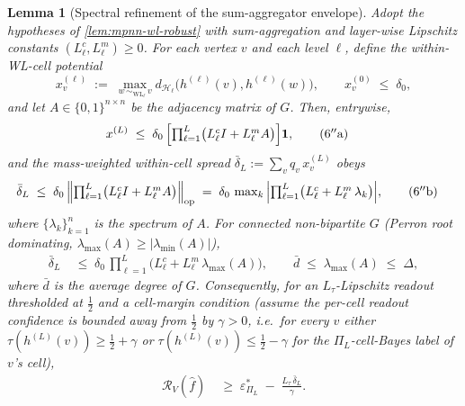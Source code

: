 \documentclass[10pt]{article}
\newtheorem{lemma}[theorem]{Lemma}
\theoremstyle{definition}
\theoremstyle{remark}
\newcommand{\eps}{\varepsilon}
\begin{document}
\begin{lemma}[Spectral refinement of the sum-aggregator envelope]\label{lem:mpnn-wl-spectral}
Adopt the hypotheses of \cref{lem:mpnn-wl-robust} with
sum-aggregation and layer-wise Lipschitz constants
$(L^{c}_{\ell}, L^{m}_{\ell}) \ge 0$. For each vertex $v$ and
each level $\ell$, define the within-WL-cell potential
\[
  x^{(\ell)}_{v} \;:=\;
    \max_{w \,\sim_{\mathrm{WL}_{\ell}}\, v}
      d_{\mathcal{H}_{\ell}}\bigl(h^{(\ell)}(v), h^{(\ell)}(w)\bigr),
  \qquad
  x^{(0)}_{v} \;\le\; \delta_{0},
\]
and let $A \in \{0,1\}^{n \times n}$ be the adjacency matrix
of $G$. Then, entrywise,
\begin{align}
  x^{(L)} \;&\le\; \delta_{0}\,
    \Bigl[ \textstyle\prod_{\ell=1}^{L}
      \bigl(L^{c}_{\ell} I + L^{m}_{\ell} A\bigr) \Bigr] \mathbf{1},
  \tag{6$''$a} \label{eq:six-pp-a}
\end{align}
and the mass-weighted within-cell spread
$\bar{\delta}_{L} := \sum_{v} q_{v}\, x^{(L)}_{v}$ obeys
\begin{align}
  \bar{\delta}_{L} \;&\le\; \delta_{0}\,
    \Bigl\| \textstyle\prod_{\ell=1}^{L}
      \bigl(L^{c}_{\ell} I + L^{m}_{\ell} A\bigr) \Bigr\|_{\mathrm{op}}
    \;=\; \delta_{0}\,
    \max_{k}\, \Bigl|
      \textstyle\prod_{\ell=1}^{L}
        \bigl(L^{c}_{\ell} + L^{m}_{\ell}\, \lambda_{k}\bigr)
    \Bigr|,
  \tag{6$''$b} \label{eq:six-pp-b}
\end{align}
where $\{\lambda_{k}\}_{k=1}^{n}$ is the spectrum of $A$. For
connected non-bipartite $G$ (Perron root dominating,
$\lambda_{\max}(A) \ge |\lambda_{\min}(A)|$),
\begin{align}
  \bar{\delta}_{L} \;&\le\; \delta_{0}\,
    \prod_{\ell=1}^{L}
      \bigl(L^{c}_{\ell} + L^{m}_{\ell}\, \lambda_{\max}(A)\bigr),
  \qquad
  \bar{d} \;\le\; \lambda_{\max}(A) \;\le\; \Delta,
  \tag{6$''$c} \label{eq:six-pp-c}
\end{align}
where $\bar{d}$ is the average degree of $G$. Consequently,
for an $L_{\tau}$-Lipschitz readout thresholded at
$\tfrac{1}{2}$ \emph{and a cell-margin condition} (assume the
per-cell readout confidence is bounded away from $\tfrac{1}{2}$
by $\gamma > 0$, i.e.\ for every $v$ either
$\tau(h^{(L)}(v)) \ge \tfrac{1}{2} + \gamma$ or
$\tau(h^{(L)}(v)) \le \tfrac{1}{2} - \gamma$ for the
$\Pi_{L}$-cell-Bayes label of $v$'s cell),
\begin{align}
  \mathcal{R}_{V}(\widehat{f}) \;&\ge\; \eps^{*}_{\Pi_{L}}
    \;-\; \frac{L_{\tau}\, \bar{\delta}_{L}}{\gamma}.
  \tag{6$''$d} \label{eq:six-pp-d}
\end{align}
\end{lemma}
\end{document}
